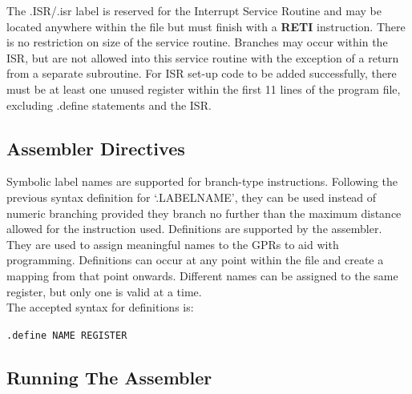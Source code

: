  The .ISR/.isr label is reserved for the Interrupt Service Routine and may be located anywhere within the file but must finish with a \textbf{RETI} instruction. There is no restriction on size of the service routine.
Branches may occur within the ISR, but are not allowed into this service routine with the exception of a return from a separate subroutine. For ISR set-up code to be added successfully, there must be at least one unused register within the first 11 lines of the program file, excluding .define statements and the ISR.

\subsection{Assembler Directives}
Symbolic label names are supported for branch-type instructions. Following the previous syntax definition for `.LABELNAME', they can be used instead of numeric branching provided they branch no further than the maximum distance allowed for the instruction used. 
Definitions are supported by the assembler. 
They are used to assign meaningful names to the GPRs to aid with programming.
Definitions can occur at any point within the file and create a mapping from that point onwards. 
Different names can be assigned to the same register, but only one is valid at a time. \\


 The accepted syntax for definitions is:

\begin{center}\texttt{.define NAME REGISTER}\end{center}

\subsection{Running The Assembler}\label{sect:runningassembler}

